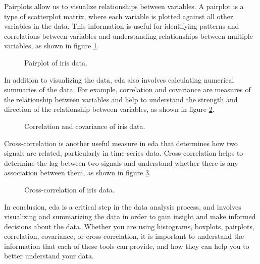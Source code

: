 Pairplots allow us to visualize relationships between variables. A pairplot is a type of scatterplot matrix, where each variable is plotted against all other variables in the data. This information is useful for identifying patterns and correlations between variables and understanding relationships between multiple variables, as shown in figure \ref{fig:pairplot}.

\begin{figure}
  \begin{center}
    \resizebox{1\textwidth}{!}{}
  \end{center}
  \caption{Pairplot of iris data.}
  \label{fig:pairplot}
\end{figure}

In addition to visualizing the data, \ac{eda} also involves calculating numerical summaries of the data. For example, correlation and covariance are measures of the relationship between variables and help to understand the strength and direction of the relationship between variables, as shown in figure \ref{fig:cor-cov}.

\begin{figure}
  \begin{center}
  \end{center}
  \caption{Correlation and covariance of iris data.}
  \label{fig:cor-cov}
\end{figure}

Cross-correlation is another useful measure in \ac{eda} that determines how two signals are related, particularly in time-series data. Cross-correlation helps to determine the lag between two signals and understand whether there is any association between them, as shown in figure \ref{fig:cross-cor}.

\begin{figure}
  \begin{center}
    \resizebox{0.8\textwidth}{!}{}
  \end{center}
  \caption{Cross-correlation of iris data.}
  \label{fig:cross-cor}
\end{figure}

In conclusion, \ac{eda} is a critical step in the data analysis process, and involves visualizing and summarizing the data in order to gain insight and make informed decisions about the data. Whether you are using histograms, boxplots, pairplots, correlation, covariance, or cross-correlation, it is important to understand the information that each of these tools can provide, and how they can help you to better understand your data.

